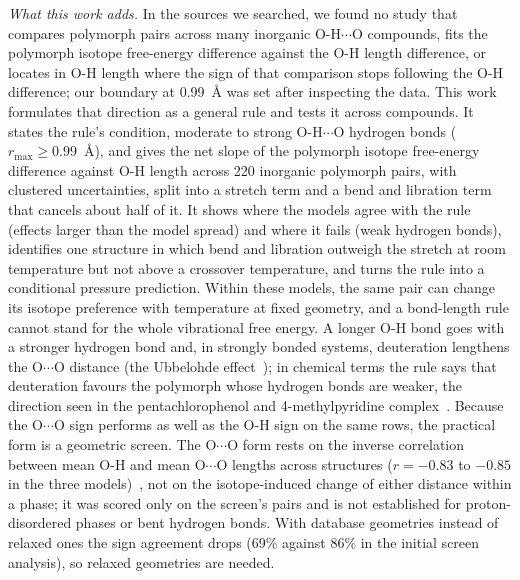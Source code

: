 \documentclass[aps,prmaterials,reprint,superscriptaddress,nofootinbib]{revtex4-2}
\begin{document}
\textit{What this work adds.} In the sources we searched, we found no study that compares polymorph pairs across many inorganic O-H$\cdots$O compounds, fits the polymorph isotope free-energy difference against the O-H length difference, or locates in O-H length where the sign of that comparison stops following the O-H difference; our boundary at 0.99~\AA{} was set after inspecting the data. This work formulates that direction as a general rule and tests it across compounds. It states the rule's condition, moderate to strong O-H$\cdots$O hydrogen bonds ($r_{\max}\geq0.99$~\AA), and gives the net slope of the polymorph isotope free-energy difference against O-H length across 220 inorganic polymorph pairs, with clustered uncertainties, split into a stretch term and a bend and libration term that cancels about half of it. It shows where the models agree with the rule (effects larger than the model spread) and where it fails (weak hydrogen bonds), identifies one structure in which bend and libration outweigh the stretch at room temperature but not above a crossover temperature, and turns the rule into a conditional pressure prediction. Within these models, the same pair can change its isotope preference with temperature at fixed geometry, and a bond-length rule cannot stand for the whole vibrational free energy. A longer O-H bond goes with a stronger hydrogen bond and, in strongly bonded systems, deuteration lengthens the O$\cdots$O distance (the Ubbelohde effect~\cite{Ubbelohde1955,Limbach2009}); in chemical terms the rule says that deuteration favours the polymorph whose hydrogen bonds are weaker, the direction seen in the pentachlorophenol and 4-methylpyridine complex~\cite{Zhou2004,Ip2012}. Because the O$\cdots$O sign performs as well as the O-H sign on the same rows, the practical form is a geometric screen. The O$\cdots$O form rests on the inverse correlation between mean O-H and mean O$\cdots$O lengths across structures ($r = -0.83$ to $-0.85$ in the three models)~\cite{Ichikawa1978}, not on the isotope-induced change of either distance within a phase; it was scored only on the screen's pairs and is not established for proton-disordered phases or bent hydrogen bonds. With database geometries instead of relaxed ones the sign agreement drops (69\% against 86\% in the initial screen analysis), so relaxed geometries are needed.
\end{document}
